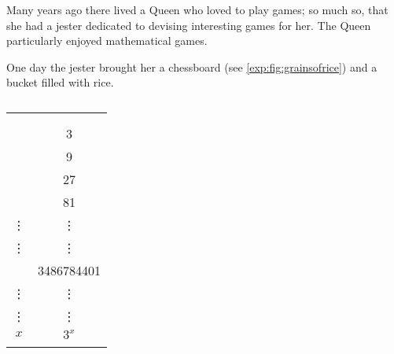 \begin{pccexample}\label{exp:prob:queenschessboard}%
	Many years ago there lived a Queen who loved to play games; so much so, that 
	she had a jester dedicated to devising interesting games for her. The Queen 
	particularly enjoyed mathematical games.
							
	One day the jester brought her a chessboard (see \cref{exp:fig:grainsofrice}) and a bucket filled with rice. 
	\begin{table}[!htb]
		\centering
		\caption{}
		\label{exp:tab:grainsofrice}
		\begin{tabular}[t]{S[table-format=2.0]S[table-format=10.0]}
			\beforeheading
			 &  \\
			             &          \\ 
			                         & 3                        \\                         & 9                        \\                         & 27                       \\                         & 81                       \\\normalline
			\mbox{\vdots}             & \mbox{\vdots}            \\\normalline
			\mbox{\vdots}             & \mbox{\vdots}            \\                        & 3486784401               \\\normalline
			\mbox{\vdots}             & \mbox{\vdots}            \\\normalline
			\mbox{\vdots}             & \mbox{\vdots}            \\\normalline
			\mbox{$x$}                & \mbox{$3^x$}             \\\lastline
		\end{tabular}
	\end{table}
							

\end{pccexample}
